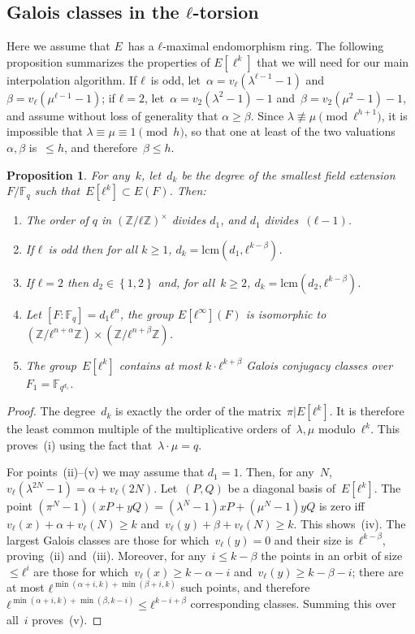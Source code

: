 \documentclass{lms}
\newtheorem{prop}[thm]{Proposition}
\def\acco#1{\left\{#1\right\}}
\newcommand{\F}{\mathbb{F}}
\begin{document}
\subsection{Galois classes in the $ℓ$-torsion}
Here we assume that $E$~has a $ℓ$-maximal endomorphism ring.  The
following proposition summarizes the properties of $E[\ell^k]$ that we
will need for our main interpolation algorithm.  If $ℓ$~is odd, let~$α
= v_ℓ(λ^{ℓ-1}-1)$ and~$β=v_ℓ(μ^{ℓ-1}-1)$; if $ℓ=2$,
let~$α=v_2(λ^2-1)-1$ and~$β = v_2(μ^2-1)-1$, and assume without loss
of generality that $α ≥ β$.  Since $λ ≢ μ \pmod{ℓ^{h+1}}$, it is
impossible that $λ ≡ μ ≡ 1 \pmod{h}$, so that one at least of the two
valuations~$α, β$ is~$≤ h$, and therefore~$β ≤ h$.
\label{sub:classes}
\begin{prop}\label{prop:classes}
For any~$k$, let~$d_k$ be the degree of the smallest field extension $F/\F_q$
such that~$E[ℓ^k]⊂E(F)$. Then:
\begin{enumerate}
\item The order of $q$ in $(ℤ/ℓℤ)^×$ divides $d_1$,
and $d_1$ divides~$(ℓ-1)$.
\item If $ℓ$~is odd then for all $k ≥ 1$,
$d_k = \mathrm {lcm} (d_1, ℓ^{k-β})$.
\item If $ℓ=2$ then $d_2 ∈ \acco{1,2}$ and, for all~$k ≥ 2$,
$d_k = \mathrm{lcm}(d_2, ℓ^{k-β})$.
\item Let $[F:\F_q]=d_1ℓ^n$, the group $E[ℓ^{∞}](F)$ is isomorphic to~$(ℤ/ℓ^{n+α} ℤ) × (ℤ/ℓ^{n+β} ℤ)$.
\item\label{prop:classes:count} The group~$E[ℓ^k]$ contains at most
$k · ℓ^{k+β}$ Galois conjugacy classes over~$F_1 = \F_{q^{d_1}}$.
\end{enumerate}
\end{prop}
\begin{proof}
The degree~$d_k$ is exactly the order of the matrix~$π|E[ℓ^k]$.
It is therefore the least common multiple of the multiplicative orders
of~$λ, μ$ modulo~$ℓ^k$.
This proves~(i) using the fact that~$λ · μ = q$.

For points~(ii)--(v) we may assume that $d_1 = 1$.
Then, for any~$N$, $v_ℓ(λ^{2N}-1) = α + v_{ℓ} (2N)$.
Let~$(P, Q)$ be a diagonal basis of~$E[ℓ^k]$.
The point $(π^N - 1) (x P + y Q) = (λ^N-1) x P + (μ^N-1) y Q$
is zero iff $v_{ℓ} (x) + α + v_{ℓ} (N) ≥ k$
and~$v_{ℓ} (y) + β + v_{ℓ} (N) ≥ k$. This shows~(iv).
The largest Galois classes
are those for which~$v_{ℓ} (y) = 0$ and their size is~$ℓ^{k - β}$,
proving~(ii) and~(iii).
Moreover, for any~$i ≤ k-β$ the points in an orbit of size~$≤ ℓ^i$
are those for which~$v_{ℓ} (x) ≥ k - α - i$ and~$v_{ℓ} (y) ≥ k - β - i$;
there are at most $ℓ^{\min(α+i, k) + \min (β+i, k)}$ such points,
and therefore $ℓ^{\min(α+i, k) + \min(β, k-i)} ≤ ℓ^{k-i+β}$
corresponding classes.
Summing this over all~$i$ proves~(v).
\end{proof}
\end{document}

